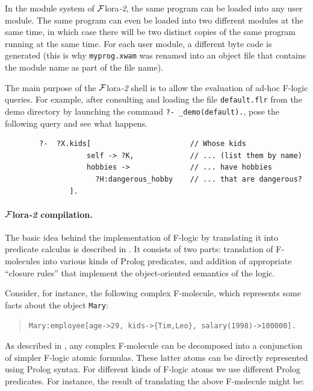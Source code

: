 \documentclass[11pt]{article}
\newcommand{\FLORA}{{\mbox{\sc ${\cal F}${lora}\rm\emph{-2}}}\xspace}
\newcommand{\fl}{\mbox{F-logic}\xspace}
\newcommand{\ofile}{xwam}
\begin{document}
In the module system of \FLORA, the same program can be loaded into any
user module. The same program can even be loaded into two different
modules at the same time, in which case there will be two distinct copies
of the same program running at the same time. For each user module, a different
byte code is generated (this is why {\tt myprog.\ofile} was renamed into an
object file that contains the module name as part of the file name).

The main purpose of the \FLORA shell is to allow the evaluation
of ad-hoc \fl queries. For example, after consulting and loading the
file \texttt{default.flr} from the demo directory by launching
the command \texttt{?-~\_demo(default).}, pose the following query
and see what happens.
\begin{verbatim}
        ?-  ?X.kids[                       // Whose kids
                   self -> ?K,             // ... (list them by name)
                   hobbies ->              // ... have hobbies
                     ?H:dangerous_hobby    // ... that are dangerous?
               ]. 
\end{verbatim}


\paragraph{\FLORA compilation.}
The basic idea behind the implementation of \fl by translating it into
predicate calculus is described in \cite{KLW95}. It consists of two parts:
translation of F-molecules into various kinds of Prolog predicates, and
addition of appropriate ``closure rules'' that implement the
object-oriented semantics of the logic.

Consider, for instance, the following complex F-molecule, which represents
some facts about the object \texttt{Mary}:

\begin{quote}
\begin{verbatim}
Mary:employee[age->29, kids->{Tim,Leo}, salary(1998)->100000].
\end{verbatim}
\end{quote}

As described in \cite{KLW95}, any complex F-molecule can be
decomposed into a conjunction of simpler \fl atomic formulas. These
latter atoms can be directly represented using Prolog syntax.  For
different kinds of \fl atoms we use different Prolog predicates. For
instance, the result of translating the above F-molecule might be:
\end{document}
